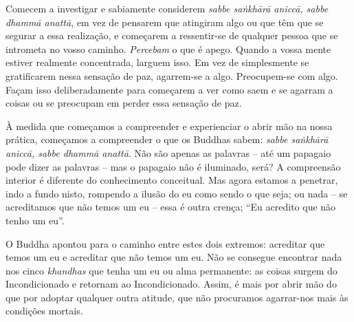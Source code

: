Comecem a investigar e sabiamente considerem \emph{sabbe saṅkhārā aniccā, sabbe
  dhammā anattā}, em vez de pensarem que atingiram algo ou que têm que se
segurar a essa realização, e começarem a ressentir-se de qualquer pessoa que se
intrometa no vosso caminho. \emph{Percebam} o que é apego. Quando a vossa mente
estiver realmente concentrada, larguem isso. Em vez de simplesmente se
gratificarem nessa sensação de paz, agarrem-se a algo. Preocupem-se com algo.
Façam isso deliberadamente para começarem a ver como saem e se agarram a coisas
ou se preocupam em perder essa sensação de paz.

À medida que começamos a compreender e experienciar o abrir mão na nossa
prática, começamos a compreender o que os Buddhas sabem: \emph{sabbe saṅkhārā aniccā,
  sabbe dhammā anattā}. Não são apenas as palavras -- até um papagaio pode dizer
as palavras -- mas o papagaio não é iluminado, será? A compreensão interior é
diferente do conhecimento conceitual. Mas agora estamos a penetrar, indo a fundo
nisto, rompendo a ilusão do eu como sendo o que seja; ou nada -- se acreditamos
que não temos um eu -- essa é outra crença; ``Eu acredito que não tenho um eu''.

O Buddha apontou para o caminho entre estes dois extremos: acreditar que temos
um eu e acreditar que não temos um eu. Não se consegue encontrar nada nos cinco
\emph{khandhas} que tenha um eu ou alma permanente: as coisas surgem do
Incondicionado e retornam ao Incondicionado. Assim, é mais por abrir mão do que
por adoptar qualquer outra atitude, que não procuramos agarrar-nos mais às
condições mortais.

